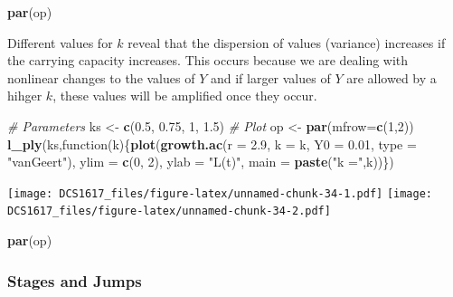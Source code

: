 \documentclass[]{book}
\newenvironment{Shaded}{\begin{snugshade}}{\end{snugshade}}
\newcommand{\KeywordTok}[1]{\textcolor[rgb]{0.13,0.29,0.53}{\textbf{{#1}}}}
\newcommand{\DataTypeTok}[1]{\textcolor[rgb]{0.13,0.29,0.53}{{#1}}}
\newcommand{\DecValTok}[1]{\textcolor[rgb]{0.00,0.00,0.81}{{#1}}}
\newcommand{\FloatTok}[1]{\textcolor[rgb]{0.00,0.00,0.81}{{#1}}}
\newcommand{\StringTok}[1]{\textcolor[rgb]{0.31,0.60,0.02}{{#1}}}
\newcommand{\CommentTok}[1]{\textcolor[rgb]{0.56,0.35,0.01}{\textit{{#1}}}}
\newcommand{\NormalTok}[1]{{#1}}
\begin{document}
\begin{Shaded}
\begin{Highlighting}[]
\KeywordTok{par}\NormalTok{(op)}
\end{Highlighting}
\end{Shaded}

Different values for \(k\) reveal that the dispersion of values
(variance) increases if the carrying capacity increases. This occurs
because we are dealing with nonlinear changes to the values of \(Y\) and
if larger values of \(Y\) are allowed by a hihger \(k\), these values
will be amplified once they occur.

\begin{Shaded}
\begin{Highlighting}[]
\CommentTok{# Parameters}
\NormalTok{ks <-}\StringTok{ }\KeywordTok{c}\NormalTok{(}\FloatTok{0.5}\NormalTok{, }\FloatTok{0.75}\NormalTok{, }\DecValTok{1}\NormalTok{, }\FloatTok{1.5}\NormalTok{)}
\CommentTok{# Plot }
\NormalTok{op <-}\StringTok{ }\KeywordTok{par}\NormalTok{(}\DataTypeTok{mfrow=}\KeywordTok{c}\NormalTok{(}\DecValTok{1}\NormalTok{,}\DecValTok{2}\NormalTok{))}
\KeywordTok{l_ply}\NormalTok{(ks,function(k)\{}\KeywordTok{plot}\NormalTok{(}\KeywordTok{growth.ac}\NormalTok{(}\DataTypeTok{r =} \FloatTok{2.9}\NormalTok{, }\DataTypeTok{k =} \NormalTok{k, }\DataTypeTok{Y0 =} \FloatTok{0.01}\NormalTok{, }\DataTypeTok{type =} \StringTok{"vanGeert"}\NormalTok{),}
                          \DataTypeTok{ylim =} \KeywordTok{c}\NormalTok{(}\DecValTok{0}\NormalTok{, }\DecValTok{2}\NormalTok{), }\DataTypeTok{ylab =} \StringTok{"L(t)"}\NormalTok{, }\DataTypeTok{main =} \KeywordTok{paste}\NormalTok{(}\StringTok{"k ="}\NormalTok{,k))\})}
\end{Highlighting}
\end{Shaded}

\texttt{[image: DCS1617\_files/figure-latex/unnamed-chunk-34-1.pdf]}
\texttt{[image: DCS1617\_files/figure-latex/unnamed-chunk-34-2.pdf]}

\begin{Shaded}
\begin{Highlighting}[]
\KeywordTok{par}\NormalTok{(op)}
\end{Highlighting}
\end{Shaded}

\subsubsection*{Stages and Jumps}\label{stages-and-jumps}
\end{document}
